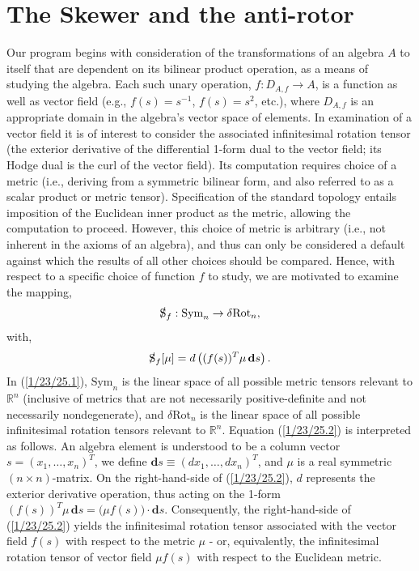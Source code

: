 \documentclass{amsart}
\theoremstyle{definition}
\numberwithin{theorem}{section}
\numberwithin{equation}{section}
\begin{document}
\section{The Skewer and the anti-rotor} Our program begins with consideration of the transformations of an algebra $A$ to itself that are dependent on its bilinear product operation, as a means of studying the algebra.  Each such unary operation, $f:D_{A,f}\rightarrow A$, is a function as well as vector field (e.g., $f(s)=s^{-1}$, $f(s)=s^2$, etc.), where $D_{A,f}$ is an appropriate domain in the algebra's vector space of elements.  In examination of a vector field it is of interest to consider the associated infinitesimal rotation tensor (the exterior derivative of the differential 1-form dual to the vector field; its Hodge dual is the curl of the vector field).  Its computation requires choice of a metric (i.e., deriving from a symmetric bilinear form, and also referred to as a scalar product or metric tensor).  Specification of the standard topology entails imposition of the Euclidean inner product as the metric, allowing the computation to proceed.  However, this choice of metric is arbitrary (i.e., not inherent in the axioms of an algebra), and thus can only be considered a default against which the results of all other choices should be compared.  Hence, with respect to a specific choice of function $f$ to study, we are motivated to examine the mapping, \enlargethispage{1cm}  \begin{equation}\label{1/23/25.1} \slashed{\text{S}}_f: \text{Sym}_n \rightarrow \delta\text{Rot}_n,\end{equation}  
with, \begin{equation}\label{1/23/25.2} \slashed{\text{S}}_f[\mu] = d\left((f(s))^T \mu \,\mathbf{d}s\right).  \end{equation}
In (\ref{1/23/25.1}), $\text{Sym}_n$ is the linear space of all possible metric tensors relevant to $\mathbb{R}^n$ (inclusive of metrics that are not necessarily positive-definite and not necessarily nondegenerate), and $\delta\text{Rot}_n$ is the linear space of all possible infinitesimal rotation tensors relevant to $\mathbb{R}^n$.  Equation (\ref{1/23/25.2}) is interpreted as follows.  An algebra element is understood to be a column vector $s=(x_1,\dots,x_n)^T$, we define $\mathbf{d}s \equiv (dx_1,\dots,dx_n)^T$, and $\mu$ is a real symmetric $(n\times n)$-matrix.  On the right-hand-side of (\ref{1/23/25.2}), $d$ represents the exterior derivative operation, thus acting on the 1-form $(f(s))^T \mu \,\mathbf{d}s = \big(\mu f(s)\big)\cdot\mathbf{d}s$.   Consequently, the right-hand-side of (\ref{1/23/25.2}) yields the infinitesimal rotation tensor associated with the vector field $f(s)$ with respect to the metric $\mu$ - or, equivalently, the infinitesimal rotation tensor of vector field $\mu f(s)$ with respect to the Euclidean metric.
\end{document}
